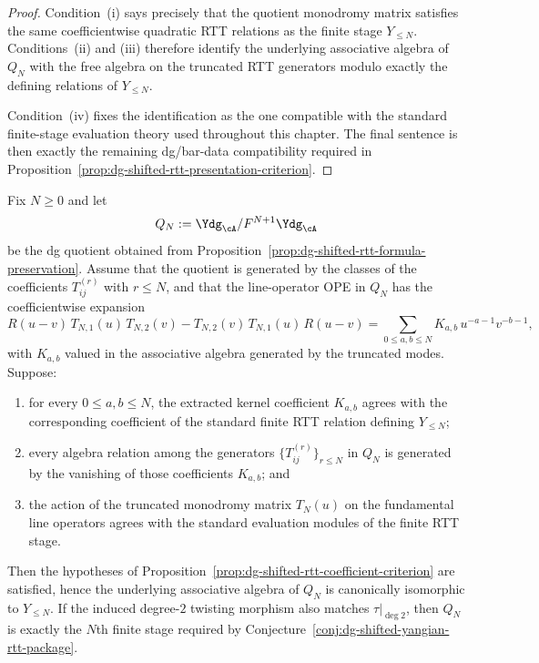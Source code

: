 \begin{proof}
Condition~\textup{(i)} says precisely that the quotient monodromy
matrix satisfies the same coefficientwise quadratic RTT relations as
the finite stage $Y_{\le N}$.  Conditions~\textup{(ii)} and
\textup{(iii)} therefore identify the underlying associative algebra of
$Q_N$ with the free algebra on the truncated RTT generators modulo
exactly the defining relations of $Y_{\le N}$.

Condition~\textup{(iv)} fixes the identification as the one compatible
with the standard finite-stage evaluation theory used throughout this
chapter.  The final sentence is then exactly the remaining dg/bar-data
compatibility required in
Proposition~\ref{prop:dg-shifted-rtt-presentation-criterion}.
\end{proof}

\begin{proposition}
\label{prop:dg-shifted-rtt-kernel-coefficient-criterion}
Fix $N \ge 0$ and let
\[
Q_N:=\Ydg_{\cA}/F^{N+1}\Ydg_{\cA}
\]
be the dg quotient obtained from
Proposition~\ref{prop:dg-shifted-rtt-formula-preservation}.  Assume
that the quotient is generated by the classes of the coefficients
$T_{ij}^{(r)}$ with $r \le N$, and that the line-operator OPE in $Q_N$
has the coefficientwise expansion
\[
R(u-v)\,T_{N,1}(u)\,T_{N,2}(v)-T_{N,2}(v)\,T_{N,1}(u)\,R(u-v)
=\sum_{0 \le a,b \le N} K_{a,b}\,u^{-a-1}v^{-b-1},
\]
with $K_{a,b}$ valued in the associative algebra generated by the
truncated modes.  Suppose:
\begin{enumerate}[label=\textup{(\roman*)}]
\item for every $0 \le a,b \le N$, the extracted kernel coefficient
  $K_{a,b}$ agrees with the corresponding coefficient of the standard
  finite RTT relation defining $Y_{\le N}$;
\item every algebra relation among the generators
  $\{T_{ij}^{(r)}\}_{r \le N}$ in $Q_N$ is generated by the vanishing of
  those coefficients $K_{a,b}$; and
\item the action of the truncated monodromy matrix $T_N(u)$ on the
  fundamental line operators agrees with the standard evaluation
  modules of the finite RTT stage.
\end{enumerate}
Then the hypotheses of
Proposition~\ref{prop:dg-shifted-rtt-coefficient-criterion} are
satisfied, hence the underlying associative algebra of $Q_N$ is
canonically isomorphic to $Y_{\le N}$.  If the induced degree-$2$
twisting morphism also matches $\tau|_{\deg 2}$, then $Q_N$ is exactly
the $N$th finite stage required by
Conjecture~\ref{conj:dg-shifted-yangian-rtt-package}.
\end{proposition}

